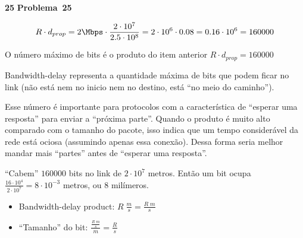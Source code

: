 \documentclass{article}
\newcounter{exe-list}
\newenvironment{exe-list}
    {\begin{list}{\alph{exe-list}.}{\usecounter{exe-list}}}
    {\end{list}}
\newenvironment{exe}[2][Problema]
    {\newcommand{\opt}{(Opcional)}%
    \newcommand{\sketch}[1]{{\bfseries Rascunho:} ##1}%
    \medskip\par\noindent\ifthenelse{\equal{#1}{}}
        {\textbf{\large #2}}
        {\textbf{\large #1~#2}}%
    \medskip\par\noindent}
    {\medskip}
\begin{document}
\begin{exe}{25}
    \begin{exe-list}
    \item \[
            R \cdot d_{prop}
            = 2 \Mbps \cdot \frac{2 \cdot 10^7}{2.5 \cdot 10^8}
            = 2 \cdot 10^6 \cdot 0.08
            = 0.16 \cdot 10^6
            = 160000
        \]
    \item O número máximo de bits é o produto do item anterior
        \( R \cdot d_{prop} = 160000 \)
    \item Bandwidth-delay representa a quantidade máxima de bits
        que podem ficar no link
        (não está nem no inicio nem no destino,
        está ``no meio do caminho'').

        Esse número é importante para protocolos
        com a característica de ``esperar uma resposta''
        para enviar a ``próxima parte''.
        Quando o produto é muito alto
        comparado com o tamanho do pacote,
        isso indica que um tempo considerável da rede
        está ociosa (assumindo apenas essa conexão).
        Dessa forma seria melhor mandar mais ``partes''
        antes de ``esperar uma resposta''.
    \item ``Cabem'' \( 160000 \) bits
        no link de \( 2 \cdot 10^7 \) metros.
        Então um bit ocupa
        \( \frac{16 \cdot 10^4}{2 \cdot 10^7} = 8 \cdot 10^{-3} \)
        metros, ou \( 8 \) milímeros.
    \item \begin{itemize}
            \item Bandwidth-delay product:
                \( R \; \frac{m}{s} = \frac{R \; m}{s} \)
            \item ``Tamanho'' do bit:
                \( \frac{\frac{R \; m}{s}}{m} = \frac{R}{s} \)
        \end{itemize}
    \end{exe-list}
\end{exe}
\end{document}
